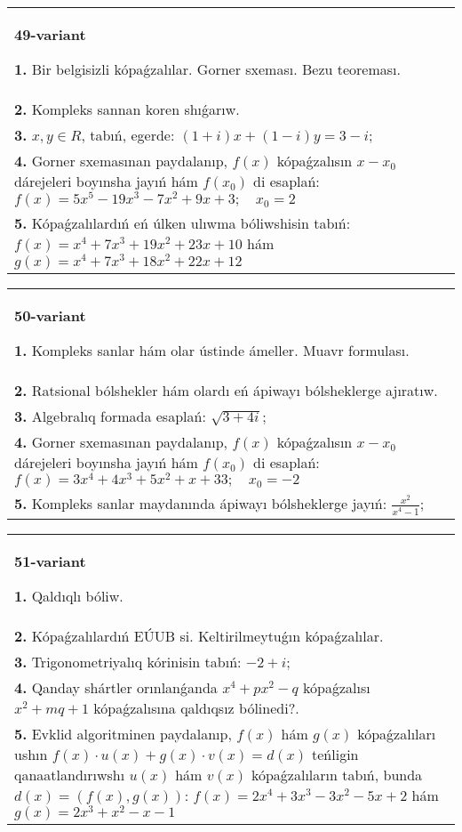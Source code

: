 \documentclass{article}
\begin{document}
\begin{tabular}{m{17cm}}
\textbf{49-variant}
\newline

\textbf{1.} Bir belgisizli kópaǵzalılar. Gorner sxeması. Bezu teoreması.  \\
\textbf{2.} Kompleks sannan koren shıǵarıw. \\
\textbf{3.}  $x, y \in R$, tabıń, egerde:  $(1+i) x+(1-i) y=3-i$; \\
\textbf{4.} Gorner sxemasınan paydalanıp, $f(x)$ kópaǵzalısın $x-x_0$ dárejeleri boyınsha jayıń hám $f\left(x_0\right)$ di esaplań: $f(x)=5 x^5-19 x^3-7 x^2+9 x+3 ; \quad x_0=2$ \\
\textbf{5.} Kópaǵzalılardıń eń úlken ulıwma bóliwshisin tabıń:  $f(x)=x^4+7 x^3+19 x^2+23 x+10$ hám $g(x)=x^4+7 x^3+18 x^2+22 x+12$ \\

\end{tabular}
\vspace{1cm}


\begin{tabular}{m{17cm}}
\textbf{50-variant}
\newline

\textbf{1.} Kompleks sanlar hám olar ústinde ámeller. Muavr formulası.  \\
\textbf{2.} Ratsional bólshekler hám olardı eń ápiwayı bólsheklerge ajıratıw. \\
\textbf{3.} Algebralıq formada esaplań:  $\sqrt{3+4 i}$; \\
\textbf{4.} Gorner sxemasınan paydalanıp, $f(x)$ kópaǵzalısın $x-x_0$ dárejeleri boyınsha jayıń hám $f\left(x_0\right)$ di esaplań: $f(x)=3 x^4+4 x^3+5 x^2+x+33 ; \quad x_0=-2$ \\
\textbf{5.} Kompleks sanlar maydanında ápiwayı bólsheklerge jayıń: $\frac{x^2}{x^4-1}$; \\

\end{tabular}
\vspace{1cm}


\begin{tabular}{m{17cm}}
\textbf{51-variant}
\newline

\textbf{1.} Qaldıqlı bóliw.  \\
\textbf{2.} Kópaǵzalılardıń EÚUB si. Keltirilmeytuǵın   kópaǵzalılar. \\
\textbf{3.} Trigonometriyalıq kórinisin tabıń: $-2+i$; \\
\textbf{4.} Qanday shártler orınlanǵanda $x^4+p x^2-q$ kópaǵzalısı $x^2+m q+1$ kópaǵzalısına qaldıqsız bólinedi?. \\
\textbf{5.} Evklid algoritminen paydalanıp, $f(x)$ hám $g(x)$ kópaǵzalıları ushın $f(x) \cdot u(x)+g(x) \cdot v(x)=d(x)$ teńligin qanaatlandırıwshı $u(x)$ hám $v(x)$ kópaǵzalıların tabıń, bunda $d(x)=(f(x), g(x))$:  $f(x)=2 x^4+3 x^3-3 x^2-5 x+2$ hám $g(x)=2 x^3+x^2-x-1$ \\

\end{tabular}
\vspace{1cm}
\end{document}
